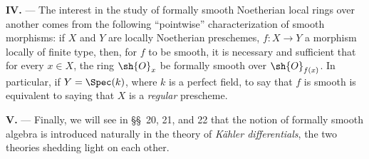 \begin{env}[19.0.2]
\medskip\noindent\textbf{IV.} ---
The interest in the study of formally smooth Noetherian local rings over another comes from the following ``pointwise'' characterization of smooth morphisms:
if $X$ and $Y$ are locally Noetherian preschemes, $f:X\to Y$ a morphism locally of finite type, then, for $f$ to be smooth, it is necessary and sufficient that for every $x\in X$, the ring $\sh{O}_x$ be formally smooth over $\sh{O}_{f(x)}$.
In particular, if $Y=\Spec(k)$, where $k$ is a perfect field, to say that $f$ is smooth is equivalent to saying that $X$ is a \emph{regular} prescheme.

\medskip\noindent\textbf{V.} ---
Finally, we will see in \S\S~20, 21, and 22 that the notion of formally smooth algebra is introduced naturally in the theory of \emph{K\"ahler differentials}, the two theories shedding light on each other.
\end{env}

